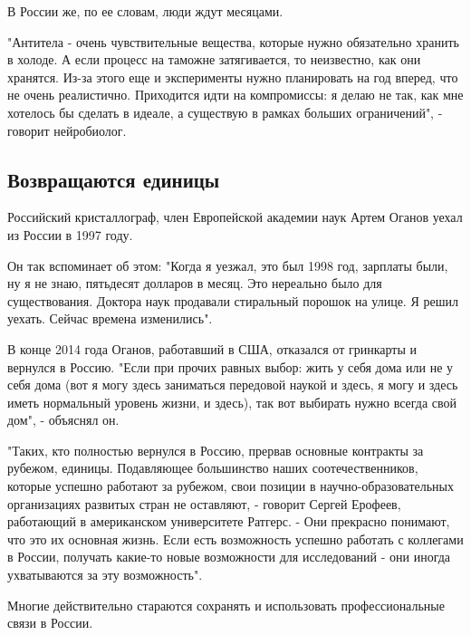 В России же, по ее словам, люди ждут месяцами.

"Антитела - очень чувствительные вещества, которые нужно обязательно хранить в холоде. А если процесс на таможне затягивается, то неизвестно, как они хранятся. Из-за этого еще и эксперименты нужно планировать на год вперед, что не очень реалистично. Приходится идти на компромиссы: я делаю не так, как мне хотелось бы сделать в идеале, а существую в рамках больших ограничений", - говорит нейробиолог.

\subsection{Возвращаются единицы}

Российский кристаллограф, член Европейской академии наук Артем Оганов уехал из России в 1997 году.

Он так вспоминает об этом: "Когда я уезжал, это был 1998 год, зарплаты были, ну я не знаю, пятьдесят долларов в месяц. Это нереально было для существования. Доктора наук продавали стиральный порошок на улице. Я решил уехать. Сейчас времена изменились".


В конце 2014 года Оганов, работавший в США, отказался от гринкарты и вернулся в Россию. "Если при прочих равных выбор: жить у себя дома или не у себя дома (вот я могу здесь заниматься передовой наукой и здесь, я могу и здесь иметь нормальный уровень жизни, и здесь), так вот выбирать нужно всегда свой дом", - объяснял он.

"Таких, кто полностью вернулся в Россию, прервав основные контракты за рубежом, единицы. Подавляющее большинство наших соотечественников, которые успешно работают за рубежом, свои позиции в научно-образовательных организациях развитых стран не оставляют, - говорит Сергей Ерофеев, работающий в американском университете Ратгерс. - Они прекрасно понимают, что это их основная жизнь. Если есть возможность успешно работать с коллегами в России, получать какие-то новые возможности для исследований - они иногда ухватываются за эту возможность".

Многие действительно стараются сохранять и использовать профессиональные связи в России.

